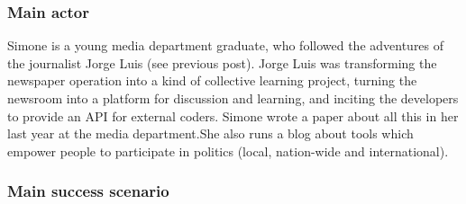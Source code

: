 \subsubsection{Main actor}

Simone is a young media department graduate, who followed the adventures
of the journalist Jorge Luis (see previous post). Jorge Luis was
transforming the newspaper operation into a kind of collective learning
project, turning the newsroom into a platform for discussion and
learning, and inciting the developers to provide an API for external
coders. Simone wrote a paper about all this in her last year at the
media department.\textbf{}She also runs a blog about tools which empower
people to participate in politics (local, nation-wide and
international).

\subsubsection{Main success scenario}

